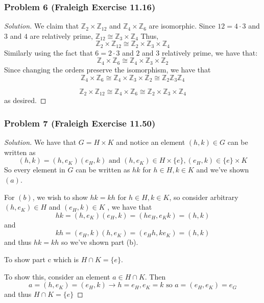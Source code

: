 \documentclass[11pt]{article}
\newcommand{\1}{\mathbf{1}}
\theoremstyle{definition}
\newenvironment{solution}{\begin{proof}[Solution]}{\end{proof}}
\begin{document}
\subsubsection*{Problem 6 (Fraleigh Exercise 11.16)}
\begin{solution}
    We claim that \(\mathbb{Z}_2 \times \mathbb{Z}_{12}\)  and \(\mathbb{Z}_4 \times
    \mathbb{Z}_6\) are isomorphic.
    Since \(12 = 4 \cdot 3\) and \(3\) and \(4\) are relatively prime, \(\mathbb{Z}_{12} \cong
    \mathbb{Z}_3 \times \mathbb{Z}_4\) 
    Thus, \[\mathbb{Z}_2\times\mathbb{Z}_{12} \cong \mathbb{Z}_2\times
    \mathbb{Z}_3\times\mathbb{Z}_4\]
    Similarly using the fact that \(6 = 2\cdot 3\) and \(2\) and \(3\) relatively prime, we
    have that:
    \[\mathbb{Z}_4 \times \mathbb{Z}_6 \cong \mathbb{Z}_4 \times \mathbb{Z}_3\times
    \mathbb{Z}_2\]
    Since changing the orders preserve the isomorphism, we have that 
 \[\mathbb{Z}_4 \times \mathbb{Z}_6 \cong \mathbb{Z}_4 \times \mathbb{Z}_3\times
 \mathbb{Z}_2\cong \mathbb{Z}_2\mathbb{Z}_3\mathbb{Z}_4\]

    \[\mathbb{Z}_2 \times \mathbb{Z}_{12} \cong \mathbb{Z}_4\times\mathbb{Z}_6 \cong
\mathbb{Z}_2\times\mathbb{Z}_3\times\mathbb{Z}_4\]
as desired.
\end{solution}
\subsubsection*{Problem 7 (Fraleigh Exercise 11.50)}
\begin{solution}
   We have that \(G = H \times K\) and notice an element \((h, k) \in G\) can be written as
   \[(h, k)  = (h, e_K)(e_H, k) \text{ and } (h, e_K) \in H\times\{e\}, (e_H, k) \in \{e\}
   \times K\]
   So every element in \(G\) can be written as \(hk\) for \(h \in H, k\in K\) and we've shown
   \((a)\).
   \par For \((b)\),  we wish to show \(hk = kh\) for \(h\in H,k  \in K\), so consider 
   arbitrary\((h, e_K)\in H\) and \((e_H, k) \in K\) , we have that \[hk = (h,e_K)(e_H,k) =
   (he_H, e_Kk) = (h,k)\] and \[kh = (e_H,k)(h,e_K) = (e_Hh,ke_K)=(h,k)\] and thus
   \(hk = kh\)
   so we've shown part (b).
   \par To show part c which is $H \cap K = \{e\}$.
   \par To show this, consider an element $a \in H \cap K.$
   Then $$a = (h, e_K) = (e_H, k)\rightarrow h = e_H, e_K = k \text{ so } a = (e_H, e_K)
   = e_G$$
   and thus $H \cap K = \{e\}$
\end{solution}
\end{document}
